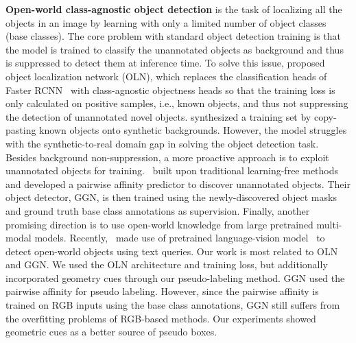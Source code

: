 \documentclass{article} \usepackage{iclr2023_conference,times}
\begin{document}
\textbf{Open-world class-agnostic object detection} is the task of localizing all the objects in an image by learning with only a limited number of object classes (base classes). 
The core problem with standard object detection training is that the model is trained to classify the unannotated objects as background and thus is suppressed to detect them at inference time. 
To solve this issue, \citet{kim_learning_2021} proposed object localization network (OLN), which replaces the classification heads of Faster RCNN~\citep{ren_faster_2015} with class-agnostic objectness heads so that the training loss is only calculated on positive samples, i.e., known objects, and thus not suppressing the detection of unannotated novel objects. 
\citet{saito_learning_2021} synthesized a training set by copy-pasting known objects onto synthetic backgrounds. However, the model struggles with the synthetic-to-real domain gap in solving the object detection task. 
Besides background non-suppression, a more proactive approach is to exploit unannotated objects for training.~\citet{wang2022open} built upon traditional learning-free methods and developed a pairwise affinity predictor to discover unannotated objects. Their object detector, GGN, is then trained using the newly-discovered object masks and ground truth base class annotations as supervision. 
Finally, another promising direction is to use open-world knowledge from large pretrained multi-modal models. Recently,~\citet{minderer2022simple, Maaz2022Multimodal} made use of pretrained language-vision model~\citep{radford2021learning} to detect open-world objects using text queries. Our work is most related to OLN and GGN. We used the OLN architecture and training loss, but additionally incorporated geometry cues through our pseudo-labeling method. GGN used the pairwise affinity for pseudo labeling. However, since the pairwise affinity is trained on RGB inputs using the base class annotations, GGN still suffers from the overfitting problems of RGB-based methods. Our experiments showed geometric cues as a better source of pseudo boxes.
\end{document}
